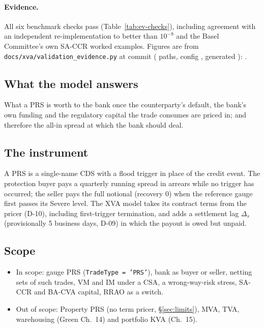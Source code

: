 \documentclass[11pt,a4paper]{article}
\begin{document}
\paragraph{Evidence.} All six benchmark checks pass (Table~\ref{tab:ev-checks}),
including agreement with an independent re-implementation to better than
$10^{-8}$ and the Basel Committee's own SA-CCR worked examples. Figures are
from \texttt{docs/xva/validation\_evidence.py} at commit \evCommit{}
(\evPaths{} paths, config \evConfig{}, generated \evGenerated{}): \evAllPass{}.

\mkmpurpose

\subsection{What the model answers}
What a PRS is worth to the bank once the counterparty's default, the bank's
own funding and the regulatory capital the trade consumes are priced in; and
therefore the all-in spread at which the bank should deal.

\subsection{The instrument}
A PRS is a single-name CDS with a flood trigger in place of the credit event.
The protection buyer pays a quarterly running spread in arrears while no
trigger has occurred; the seller pays the full notional (recovery 0) when the
reference gauge first passes its Severe level. The XVA model takes its
contract terms from the pricer (D-10), including first-trigger termination,
and adds a settlement lag $\Delta_s$ (provisionally 5 business days, D-09) in
which the payout is owed but unpaid.

\subsection{Scope}
\begin{itemize}[leftmargin=*]
\item In scope: gauge PRS (\texttt{TradeType = 'PRS'}), bank as buyer or
  seller, netting sets of such trades, VM and IM under a CSA, a wrong-way-risk
  stress, SA-CCR and BA-CVA capital, RRAO as a switch.
\item Out of scope: Property PRS (no term pricer, \S\ref{sec:limits}), MVA,
  TVA, warehousing (Green Ch.~14) and portfolio KVA (Ch.~15).
\end{itemize}
\end{document}
